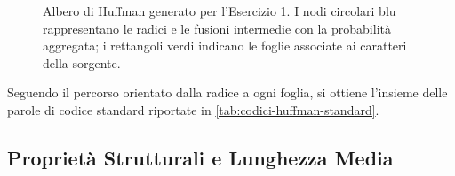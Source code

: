 \begin{figure}[H]
\caption{Albero di Huffman generato per l'Esercizio 1. I nodi circolari blu rappresentano le radici e le fusioni intermedie con la probabilit\`a aggregata; i rettangoli verdi indicano le foglie associate ai caratteri della sorgente.}
\label{fig:albero-huffman-esercizio}
\end{figure}

Seguendo il percorso orientato dalla radice a ogni foglia, si ottiene l'insieme delle parole di codice standard riportate in \autoref{tab:codici-huffman-standard}.

\begin{table}[H]
\centering
\caption{Insieme delle parole di codice generate dall'albero di Huffman standard per l'alfabeto $A$.}
\label{tab:codici-huffman-standard}
\vspace{2mm}
\end{table}

\FloatBarrier
\subsection{Propriet\`a Strutturali e Lunghezza Media}
\label{subsec:proprieta-strutturali-huffman}

